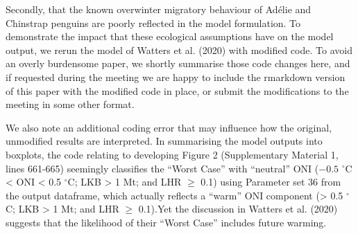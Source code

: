 \documentclass[]{elsarticle} %
\begin{document}
Secondly, that the known overwinter migratory behaviour of Adélie and
Chinstrap penguins are poorly reflected in the model formulation. To
demonstrate the impact that these ecological assumptions have on the
model output, we rerun the model of Watters et al. (2020) with modified
code. To avoid an overly burdensome paper, we shortly summarise those
code changes here, and if requested during the meeting we are happy to
include the rmarkdown version of this paper with the modified code in
place, or submit the modifications to the meeting in some other format.

We also note an additional coding error that may influence how the
original, unmodified results are interpreted. In summarising the model
outputs into boxplots, the code relating to developing Figure 2
(Supplementary Material 1, lines 661-665) seemingly classifies the
``Worst Case'' with ``neutral'' ONI (\({-0.5}\) \(^{\circ}\)C
\textless{} ONI \textless{} 0.5 \(^{\circ}\)C; LKB \textgreater{} 1 Mt;
and LHR \(\geqslant\) 0.1) using Parameter set 36 from the output
dataframe, which actually reflects a ``warm'' ONI component
(\textgreater{} 0.5 \(^{\circ}\)C; LKB \textgreater{} 1 Mt; and LHR
\(\geqslant\) 0.1).Yet the discussion in Watters et al. (2020) suggests
that the likelihood of their ``Worst Case'' includes future warming.
\end{document}
